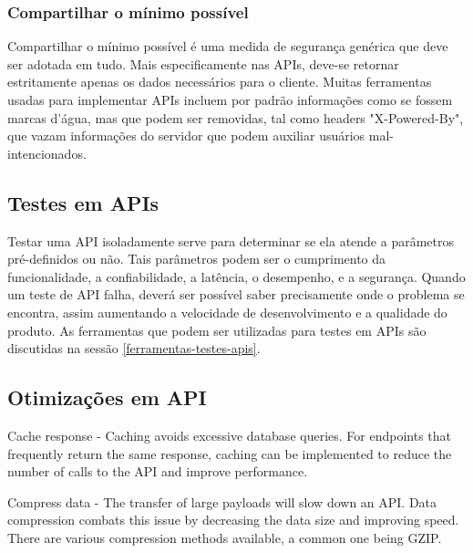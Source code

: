 \subsubsection*{Compartilhar o mínimo possível}

Compartilhar o mínimo possível é uma medida de segurança genérica que deve ser adotada em tudo. Mais especificamente nas APIs, deve-se retornar estritamente apenas os dados necessários para o cliente. Muitas ferramentas usadas para implementar APIs incluem por padrão informações como se fossem marcas d'água, mas que podem ser removidas, tal como headers "X-Powered-By", que vazam informações do servidor que podem auxiliar usuários mal-intencionados. \cite{rapidAPI-security}

\subsection{Testes em APIs}

Testar uma API isoladamente serve para determinar se ela atende a parâmetros pré-definidos ou não. Tais parâmetros podem ser o cumprimento da funcionalidade, a confiabilidade, a latência, o desempenho, e a segurança. Quando um teste de API falha, deverá ser possível saber precisamente onde o problema se encontra, assim aumentando a velocidade de desenvolvimento e a qualidade do produto. As ferramentas que podem ser utilizadas para testes em APIs são discutidas na sessão \autoref{ferramentas-testes-apis}.


\subsection{Otimizações em API}

Cache response - Caching avoids excessive database queries. For endpoints that frequently return the same response, caching can be implemented to reduce the number of calls to the API and improve performance.

Compress data - The transfer of large payloads will slow down an API. Data compression combats this issue by decreasing the data size and improving speed. There are various compression methods available, a common one being GZIP.

